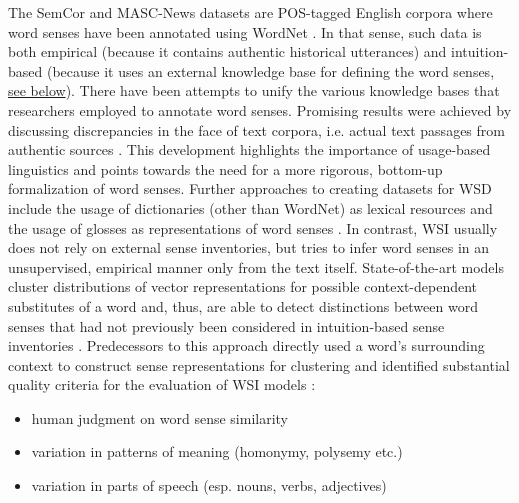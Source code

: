 The SemCor \parencite{mihalceaSemCorCorpus2008} and MASC-News \parencite[4218]{moroAnnotatingMASCCorpus2014} datasets are \gls{POS}-tagged English corpora where word senses have been annotated using WordNet \parencite{tengiDesignImplementationWordNet1998}. In that sense, such data is both empirical (because it contains authentic historical utterances) and intuition-based (because it uses an external knowledge base for defining the word senses, \hyperref[WordNet]{see below}). There have been attempts to unify \parencite[216]{navigliBabelNetBuildingVery2010} the various knowledge bases that researchers employed to annotate word senses. Promising results were achieved by discussing discrepancies in the face of text corpora, i.e. actual text passages from authentic sources \parencite[127]{bakerWordNetFrameNetComplementary2009}. This development highlights the importance of usage-based linguistics and points towards the need for a more rigorous, bottom-up formalization of word senses. Further approaches to creating datasets for \gls{WSD} include the usage of dictionaries (other than WordNet) as lexical resources \parencites[25]{mihalceaSenseval3EnglishLexical2004}[2]{jimeno-yepesExploitingMeSHIndexing2011}[6]{yuanSemisupervisedWordSense2016} and the usage of glosses as representations of word senses \parencite[8]{luoIncorporatingGlossesNeural2018}. In contrast, \gls{WSI} usually does not rely on external sense inventories, but tries to infer word senses in an unsupervised, empirical manner only from the text itself. State-of-the-art models cluster distributions of vector representations for possible context-dependent substitutes of a word and, thus, are able to detect distinctions between word senses that had not previously been considered in intuition-based sense inventories \parencite[1-4]{amramiBetterSubstitutionbasedWord2019}. Predecessors to this approach directly used a word's surrounding context to construct sense representations for clustering and identified substantial quality criteria for the evaluation of \gls{WSI} models \parencite[876-878]{huangImprovingWordRepresentations2012}:
\begin{itemize}
	\item human judgment on word sense similarity
	\item variation in patterns of meaning (homonymy, polysemy etc.)
	\item variation in parts of speech (esp. nouns, verbs, adjectives)
\end{itemize}
